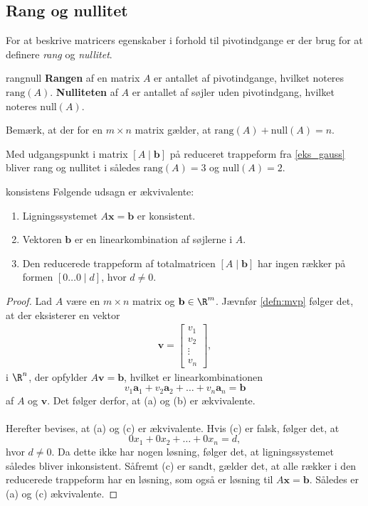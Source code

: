 \subsection{Rang og nullitet}
% 
For at beskrive matricers egenskaber i forhold til pivotindgange er der brug for at definere \textit{rang} og \textit{nullitet}.
%
\begin{defn}{}{rangnull}
\textbf{Rangen} af en matrix $A$ er antallet af pivotindgange, hvilket noteres $\text{rang}(A)$.
\textbf{Nulliteten} af $A$ er antallet af søjler uden pivotindgang, hvilket noteres $\text{null}(A)$.
\end{defn}
%
\noindent
Bemærk, at der for en $m \times n$ matrix gælder, at $\text{rang}(A)+\text{null}(A)=n$.\\
%
\begin{eks}
Med udgangspunkt i matrix $[A \mid \textbf{b}]$ på reduceret trappeform fra \ref{eks_gauss} bliver rang og nullitet i således $\text{rang}(A)=3$ og $\text{null}(A)=2$.
\end{eks}
%
\begin{thm}{}{konsistens}
%
Følgende udsagn er ækvivalente:
%
\begin{enumerate}[label=(\alph*)]
\item Ligningssystemet $A\mathbf{x}=\mathbf{b}$ er konsistent.
\item Vektoren $\mathbf{b}$ er en linearkombination af søjlerne i $A$.
\item Den reducerede trappeform af totalmatricen $[A \mid \mathbf{b}]$ har ingen rækker på formen $[ 0 \ldots 0 \mid d ]$, hvor $d \neq 0$.
\end{enumerate}
%
\end{thm}
%
%
\begin{proof}
%
Lad $A$ være en $m \times n$ matrix og $\mathbf{b} \in \R^m$. Jævnfør \ref{defn:mvp} følger det, at der eksisterer en vektor 
%
\begin{align*}    
       \mathbf{v} = \begin{bmatrix}
		v_{1} \\
        v_{2} \\
        \vdots \\
        v_{n} 
        \end{bmatrix},  
\end{align*}
%
i $\R^n$, der opfylder $A\mathbf{v}=\mathbf{b}$,
hvilket er linearkombinationen
%
$$v_1 \mathbf{a}_1+v_2 \mathbf{a}_2 + \ldots + v_n \mathbf{a}_n = \textbf{b}$$
%
af $A$ og $\textbf{v}$. 
Det følger derfor, at (a) og (b) er ækvivalente.\\\\
%
Herefter bevises, at (a) og (c) er ækvivalente. 
Hvis (c) er falsk, følger det, at
%
$$0 x_1+0 x_2 + \ldots + 0x_n =d,$$
%
hvor $d\neq0$. Da dette ikke har nogen løsning, følger det, at ligningssystemet således bliver inkonsistent. 
Såfremt (c) er sandt, gælder det, at alle rækker i den reducerede trappeform har en løsning, som også er løsning til $A\mathbf{x}=\mathbf{b}$. 
Således er (a) og (c) ækvivalente.
%
\end{proof}
